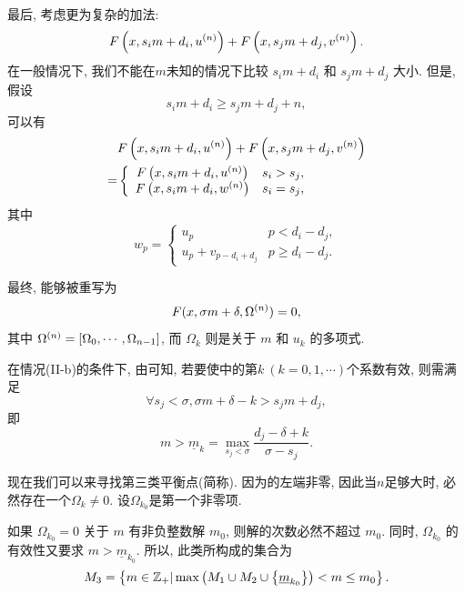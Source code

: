 最后, 考虑更为复杂的加法: 
\begin{equation}
F\left(x,s_i m+d_i,u^{(n)}\right)+F\left(x,s_j m+d_j,v^{(n)}\right).
\end{equation}
在一般情况下, 我们不能在$m$未知的情况下比较 $s_i m + d_i$ 和 $s_j m + d_j$ 大小. 但是, 假设
\begin{equation}
s_i m+d_i\ge s_j m+d_j+n, \label{cond_add}
\end{equation}
可以有 
\begin{equation}
\begin{split}
&F\left(x,s_i m+d_i,u^{(n)}\right)+F\left(x,s_j m+d_j,v^{(n)}\right) \\
=&\left\{
\begin{array}{cl}
    F\left(x,s_i m+d_i,u^{(n)}\right) & s_i>s_j,            \\
    F\left(x,s_i m+d_i,w^{(n)}\right) & s_i=s_j,
\end{array}
\right.
\end{split} \label{NEM-add}
\end{equation}
其中
\begin{equation}
w_p=\left\{
\begin{array}{cl}
u_p               & p<d_i-d_j ,   \\
u_p+v_{p-d_i+d_j} & p\ge d_i-d_j.
\end{array}
\right.
\end{equation}

最终,  能够被重写为
\begin{equation}
F(x,\sigma m + \delta,\Omega^{(n)})=0, 
\label{eq-np}
\end{equation}
其中 $\Omega^{(n)}=\left[\Omega_0,\cdots,\Omega_{n-1}\right]$, 而 $\Omega_k$ 则是关于 $m$ 和 $u_k$ 的多项式.

在情况(II-b)的条件下, 由可知, 若要使中的第$k~(k=0,1,\cdots)$个系数有效, 则需满足 
\begin{equation}
\forall s_j<\sigma, \sigma m + \delta - k > s_j m + d_j,
\end{equation}
即
\begin{equation}
m > \underline{m}_k=\underset{s_j<\sigma}{\max}{\frac{d_j-\delta+k}{\sigma-s_j}}.
\end{equation}

现在我们可以来寻找第三类平衡点(简称\BPthree{}). 因为的左端非零, 因此当$n$足够大时, 必然存在一个$\Omega_k\neq 0$. 设$\Omega_{k_0}$是第一个非零项. 

如果 $\Omega_{k_0}=0$ 关于 $m$ 有非负整数解 $m_0$, 则解的次数必然不超过 $m_0$. 同时, $\Omega_{k_0}$ 的有效性又要求 $m>\underline{m}_{k_0}$. 所以, 此类\BPthree{}所构成的集合为 
\begin{equation}
M_3=\left\{m\in \mathbb Z_+|\max\left(M_1\cup M_2 \cup \left\{\underline{m}_{k_0}\right\}\right)<m\le m_0\right\}. \label{BP31}
\end{equation}

